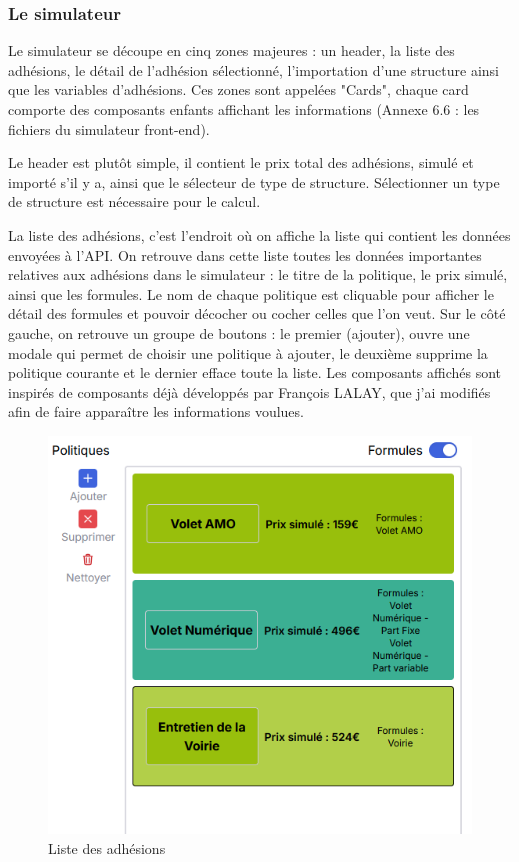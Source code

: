 \documentclass[a4paper,12pt]{report}
\begin{document}
\subsubsection{Le simulateur}

Le simulateur se découpe en cinq zones majeures : un header, la liste des adhésions, le détail de l'adhésion sélectionné, l'importation d'une structure ainsi que les variables d'adhésions. Ces zones sont appelées "Cards", chaque card comporte des composants enfants affichant les informations (Annexe 6.6 : les fichiers du simulateur front-end).

\vspace{1em}

Le header est plutôt simple, il contient le prix total des adhésions, simulé et importé s'il y a, ainsi que le sélecteur de type de structure. Sélectionner un type de structure est nécessaire pour le calcul.

\vspace{1em}

La liste des adhésions, c'est l'endroit où on affiche la liste qui contient les données envoyées à l'API. On retrouve dans cette liste toutes les données importantes relatives aux adhésions dans le simulateur : le titre de la politique, le prix simulé, ainsi que les formules. Le nom de chaque politique est cliquable pour afficher le détail des formules et pouvoir décocher ou cocher celles que l'on veut. Sur le côté gauche, on retrouve un groupe de boutons  : le premier (ajouter), ouvre une modale qui permet de choisir une politique à ajouter, le deuxième supprime la politique courante et le dernier efface toute la liste. Les composants affichés sont inspirés de composants déjà développés par François LALAY, que j'ai modifiés afin de faire apparaître les informations voulues.

\begin{figure}[H]
    \centering
    \includegraphics[scale=0.5]{adhesionList.png}
    \caption{Liste des adhésions}
    \label{fig:list-adhe}
\end{figure}
\end{document}
